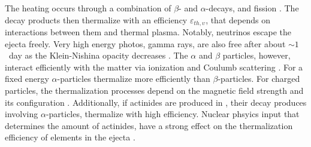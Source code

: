 The heating occurs through a combination of $\beta$- and $\alpha$-decays, 
and fission \citep{Metzger:2010,Barnes:2016umi,Hotokezaka:2017dbk}. 
%
The decay products then thermalize with an efficiency  $\varepsilon_{th,\upsilon}$, 
that depends on interactions between them and thermal plasma. 
Notably, neutrinos escape the ejecta freely. 
Very high energy photos, gamma rays, are also free after about 
${\sim}1$~day as the Klein-Nishina opacity decreases 
\citep{Hotokezaka:2017dbk,Barnes:2016umi}.
%
The $\alpha$ and $\beta$ particles, however, interact efficiently 
with the matter via ionization 
\citep{Barnes:2016umi} and Coulumb scattering \citep{Metzger:2010}.
For a fixed energy $\alpha$-particles thermalize more efficiently than 
$\beta$-particles. For charged particles, the thermalization processes 
depend on the magnetic field strength and 
its configuration \citep{Barnes:2016umi}. 
%
Additionally, if actinides are produced in \rproc{}, their decay produces 
involving $\alpha$-particles, thermalize with high efficiency. 
Nuclear phsyics input that determines the amount of actinides, 
have a strong effect on the thermalization efficiency of \rproc{} 
elements in the ejecta \citep{Barnes:2020nfi}.
%
